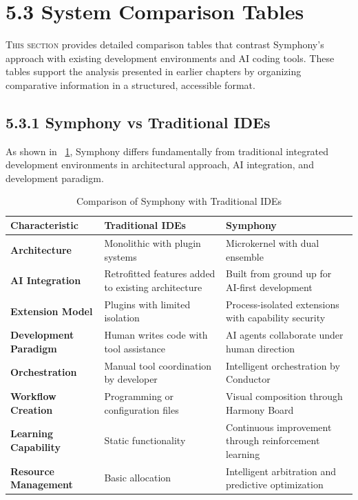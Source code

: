
\section{5.3 System Comparison Tables}
\label{sec:system-comparisons}
\setcounter{subsection}{0}

\lettrine{T}{his section} provides detailed comparison tables that contrast Symphony's approach with existing development environments and AI coding tools. These tables support the analysis presented in earlier chapters by organizing comparative information in a structured, accessible format.

\subsection*{5.3.1 Symphony vs Traditional IDEs}

As shown in ~\ref{tab:traditional-ide-comparison}, Symphony differs fundamentally from traditional integrated development environments in architectural approach, AI integration, and development paradigm.

\begin{table}[H]
\caption{Comparison of Symphony with Traditional IDEs}
\label{tab:traditional-ide-comparison}
\centering
\small
\begin{tabular}{@{}p{3.5cm}p{5cm}p{5cm}@{}}
\toprule
\textbf{Characteristic} & \textbf{Traditional IDEs} & \textbf{Symphony} \\
\midrule
\textbf{Architecture} & Monolithic with plugin systems & Microkernel with dual ensemble \\
\midrule
\textbf{AI Integration} & Retrofitted features added to existing architecture & Built from ground up for AI-first development \\
\midrule
\textbf{Extension Model} & Plugins with limited isolation & Process-isolated extensions with capability security \\
\midrule
\textbf{Development Paradigm} & Human writes code with tool assistance & AI agents collaborate under human direction \\
\midrule
\textbf{Orchestration} & Manual tool coordination by developer & Intelligent orchestration by Conductor \\
\midrule
\textbf{Workflow Creation} & Programming or configuration files & Visual composition through Harmony Board \\
\midrule
\textbf{Learning Capability} & Static functionality & Continuous improvement through reinforcement learning \\
\midrule
\textbf{Resource Management} & Basic allocation & Intelligent arbitration and predictive optimization \\
\bottomrule
\end{tabular}
\end{table}

